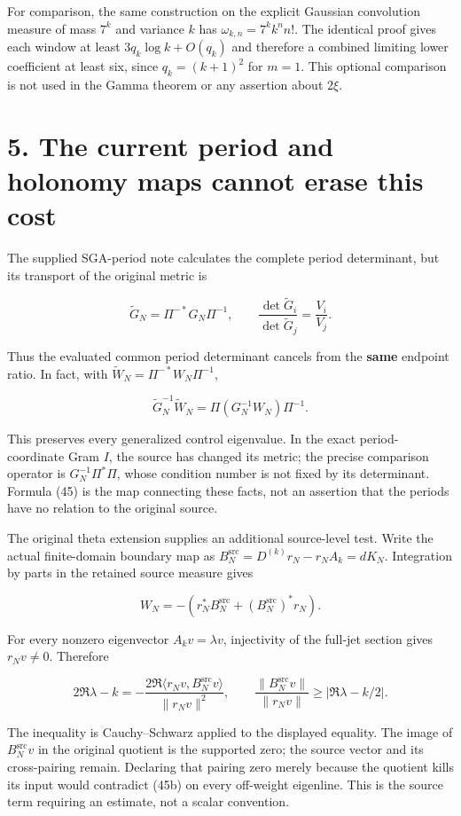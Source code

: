 \documentclass[
  11pt,
]{article}
\begin{document}
For comparison, the same construction on the explicit Gaussian
convolution measure of mass \(7^k\) and variance \(k\) has
\(\omega_{k,n}=7^k k^n n!\). The identical proof gives each window at
least \(3q_k\log k+O(q_k)\) and therefore a combined limiting lower
coefficient at least six, since \(q_k=(k+1)^2\) for \(m=1\). This
optional comparison is not used in the Gamma theorem or any assertion
about \(2\xi\).

\section{5. The current period and holonomy maps cannot erase this
cost}\label{the-current-period-and-holonomy-maps-cannot-erase-this-cost}

The supplied SGA-period note calculates the complete period determinant,
but its transport of the original metric is

\[
\widetilde G_N=\Pi^{-*}G_N\Pi^{-1},\qquad
\frac{\det\widetilde G_i}{\det\widetilde G_j}
=\frac{V_i}{V_j}.
\tag{44}
\]

Thus the evaluated common period determinant cancels from the
\textbf{same} endpoint ratio. In fact, with
\(\widetilde W_N=\Pi^{-*}W_N\Pi^{-1}\),

\[
\widetilde G_N^{-1}\widetilde W_N
=\Pi(G_N^{-1}W_N)\Pi^{-1}.
\tag{45}
\]

This preserves every generalized control eigenvalue. In the exact
period-coordinate Gram \(I\), the source has changed its metric; the
precise comparison operator is \(G_N^{-1}\Pi^*\Pi\), whose condition
number is not fixed by its determinant. Formula (45) is the map
connecting these facts, not an assertion that the periods have no
relation to the original source.

The original theta extension supplies an additional source-level test.
Write the actual finite-domain boundary map as
\(B_N^{\mathrm{src}}=D^{(k)}r_N-r_NA_k=dK_N\). Integration by parts in
the retained source measure gives

\[
W_N=-(r_N^*B_N^{\mathrm{src}}+(B_N^{\mathrm{src}})^*r_N).
\tag{45a}
\]

For every nonzero eigenvector \(A_kv=\lambda v\), injectivity of the
full-jet section gives \(r_Nv\ne0\). Therefore

\[
2\Re\lambda-k=
-\frac{2\Re\langle r_Nv,B_N^{\mathrm{src}}v\rangle}{\|r_Nv\|^2},
\qquad
\frac{\|B_N^{\mathrm{src}}v\|}{\|r_Nv\|}
\ge |\Re\lambda-k/2|.
\tag{45b}
\]

The inequality is Cauchy--Schwarz applied to the displayed equality. The
image of \(B_N^{\mathrm{src}}v\) in the original quotient is the
supported zero; the source vector and its cross-pairing remain.
Declaring that pairing zero merely because the quotient kills its input
would contradict (45b) on every off-weight eigenline. This is the source
term requiring an estimate, not a scalar convention.
\end{document}
